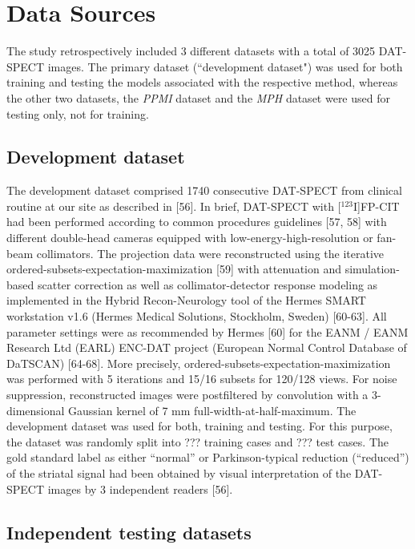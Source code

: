 \section{Data Sources}
\label{sec:data}

The study retrospectively included 3 different datasets with a total of 3025 DAT-SPECT images.
The primary dataset (``development dataset") was used for both training and testing the models associated with the respective method, 
whereas the other two datasets, the \textit{PPMI} dataset and the \textit{MPH} dataset were used for testing only, not for training.

\subsection{Development dataset}
\label{subsec:spect_dataset}

The development dataset comprised 1740 consecutive DAT-SPECT from clinical routine at our site as described in [56]. 
In brief, DAT-SPECT with [$^{123}$I]FP-CIT had been performed according to common procedures guidelines [57, 58] with different double-head cameras 
equipped with low-energy-high-resolution or fan-beam collimators. 
The projection data were reconstructed using the iterative ordered-subsets-expectation-maximization [59] with attenuation and simulation-based scatter correction 
as well as collimator-detector response modeling as implemented in the Hybrid Recon-Neurology tool of the Hermes SMART workstation v1.6 (Hermes Medical Solutions, Stockholm, Sweden) [60-63]. 
All parameter settings were as recommended by Hermes [60] for the EANM / EANM Research Ltd (EARL) ENC-DAT project (European Normal Control Database of DaTSCAN) [64-68]. 
More precisely, ordered-subsets-expectation-maximization was performed with 5 iterations and 15/16 subsets for 120/128 views. 
For noise suppression, reconstructed images were postfiltered by convolution with a 3-dimensional Gaussian kernel of 7 mm full-width-at-half-maximum. 
The development dataset was used for both, training and testing. For this purpose, the dataset was randomly split into ??? training cases and ??? test cases. 
The gold standard label as either “normal” or Parkinson-typical reduction (“reduced”) of the striatal signal had been obtained by visual interpretation of the DAT-SPECT images by 3 independent readers [56]. 

\subsection{Independent testing datasets}
\label{subsec:external_dataset}

